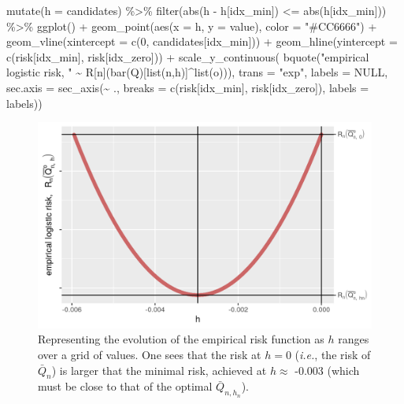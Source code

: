 \documentclass[
  11pt,
  openright,twoside]{book}
\newenvironment{Shaded}{\begin{snugshade}}{\end{snugshade}}
\newcommand{\AttributeTok}[1]{\textcolor[rgb]{0.77,0.63,0.00}{#1}}
\newcommand{\ConstantTok}[1]{\textcolor[rgb]{0.00,0.00,0.00}{#1}}
\newcommand{\DecValTok}[1]{\textcolor[rgb]{0.00,0.00,0.81}{#1}}
\newcommand{\FunctionTok}[1]{\textcolor[rgb]{0.00,0.00,0.00}{#1}}
\newcommand{\NormalTok}[1]{#1}
\newcommand{\SpecialCharTok}[1]{\textcolor[rgb]{0.00,0.00,0.00}{#1}}
\newcommand{\StringTok}[1]{\textcolor[rgb]{0.31,0.60,0.02}{#1}}
\newcommand{\Qbar}{\bar{Q}}
\theoremstyle{definition}
\theoremstyle{definition}
\theoremstyle{definition}
\theoremstyle{definition}
\theoremstyle{remark}
\begin{document}
\begin{Shaded}
\begin{Highlighting}[]
  \FunctionTok{mutate}\NormalTok{(}\AttributeTok{h =}\NormalTok{ candidates) }\SpecialCharTok{\%\textgreater{}\%}
  \FunctionTok{filter}\NormalTok{(}\FunctionTok{abs}\NormalTok{(h }\SpecialCharTok{{-}}\NormalTok{ h[idx\_min]) }\SpecialCharTok{\textless{}=} \FunctionTok{abs}\NormalTok{(h[idx\_min])) }\SpecialCharTok{\%\textgreater{}\%}
  \FunctionTok{ggplot}\NormalTok{() }\SpecialCharTok{+}
  \FunctionTok{geom\_point}\NormalTok{(}\FunctionTok{aes}\NormalTok{(}\AttributeTok{x =}\NormalTok{ h, }\AttributeTok{y =}\NormalTok{ value), }\AttributeTok{color =} \StringTok{"\#CC6666"}\NormalTok{) }\SpecialCharTok{+}
  \FunctionTok{geom\_vline}\NormalTok{(}\AttributeTok{xintercept =} \FunctionTok{c}\NormalTok{(}\DecValTok{0}\NormalTok{, candidates[idx\_min])) }\SpecialCharTok{+}
  \FunctionTok{geom\_hline}\NormalTok{(}\AttributeTok{yintercept =} \FunctionTok{c}\NormalTok{(risk[idx\_min], risk[idx\_zero])) }\SpecialCharTok{+}
  \FunctionTok{scale\_y\_continuous}\NormalTok{(}
    \FunctionTok{bquote}\NormalTok{(}\StringTok{"empirical logistic risk, "} \SpecialCharTok{\textasciitilde{}}\NormalTok{ R[n](}\FunctionTok{bar}\NormalTok{(Q)[}\FunctionTok{list}\NormalTok{(n,h)]}\SpecialCharTok{\^{}}\FunctionTok{list}\NormalTok{(o))),}
    \AttributeTok{trans =} \StringTok{"exp"}\NormalTok{, }\AttributeTok{labels =} \ConstantTok{NULL}\NormalTok{, }
    \AttributeTok{sec.axis =} \FunctionTok{sec\_axis}\NormalTok{(}\SpecialCharTok{\textasciitilde{}}\NormalTok{ .,}
                        \AttributeTok{breaks =} \FunctionTok{c}\NormalTok{(risk[idx\_min], risk[idx\_zero]),}
                        \AttributeTok{labels =}\NormalTok{ labels))}
\end{Highlighting}
\end{Shaded}

\begin{figure}

{\centering \includegraphics[width=0.7\linewidth]{img/grid-search-1} 

}

\caption{Representing the evolution of the empirical risk function as \(h\) ranges over a grid of values. One sees that the risk at \(h=0\) (\emph{i.e.}, the risk of \(\Qbar_{n}\)) is larger that the minimal risk, achieved at \(h \approx\) -0.003 (which must be close to that of the optimal \(\Qbar_{n,h_{n}}\)).}\label{fig:grid-search}
\end{figure}
\end{document}
